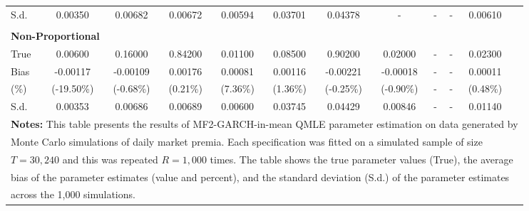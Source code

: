 \documentclass{article}
\begin{document}
\begin{table}
\begin{tabular}{lccccccccccc}
S.d. & 0.00350 & 0.00682 & 0.00672 & 0.00594 & 0.03701 & 0.04378 & - & - & - & 0.00610 \\
\mbox{}\\
\multicolumn{12}{l}{\textbf{Non-Proportional}}\\
True & 0.00600 & 0.16000 & 0.84200 & 0.01100 & 0.08500 & 0.90200 & 0.02000 & - & - & 0.02300\\
Bias & -0.00117 & -0.00109 & 0.00176 & 0.00081 & 0.00116 & -0.00221 & -0.00018 & - & - & 0.00011\\
(\%) & (-19.50\%) & (-0.68\%) & (0.21\%) & (7.36\%) & (1.36\%) & (-0.25\%) & (-0.90\%) & - & - & (0.48\%)\\
S.d. & 0.00353 & 0.00686 & 0.00689 & 0.00600 & 0.03745 & 0.04429 & 0.00846 & - & - & 0.01140\\
\midrule
\multicolumn{12}{l}{\textbf{Notes:} This table presents the results of MF2-GARCH-in-mean QMLE parameter estimation on data generated by}\\
\multicolumn{12}{l}{Monte Carlo simulations of daily market premia. Each specification was fitted on a simulated sample of size}\\
\multicolumn{12}{l}{$T=30,240$ and this was repeated $R=1,000$ times. The table shows the true parameter values (True), the average}\\
\multicolumn{12}{l}{bias of the parameter estimates (value and percent), and the standard deviation (S.d.) of the parameter estimates}\\
\multicolumn{12}{l}{across the 1,000 simulations.}\\
\midrule
\midrule
\end{tabular}
\end{table}
\end{document}
